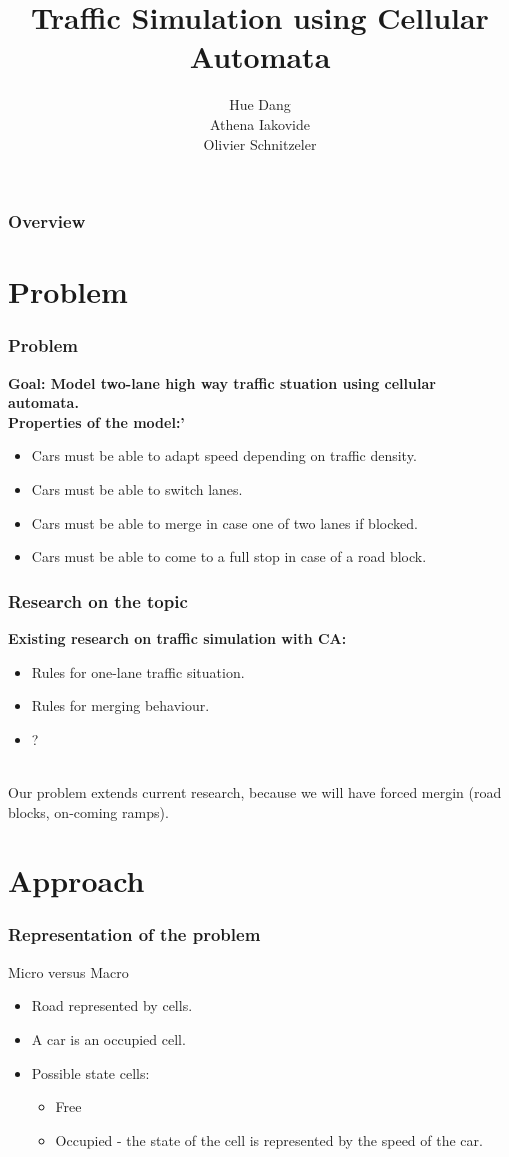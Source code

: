 \documentclass{beamer}
\title{Traffic Simulation using Cellular Automata}
\institute[Radboud University Nijmegen]{Radboud University Nijmegen}
\author{Hue Dang \\ Athena Iakovide \\ Olivier Schnitzeler}
\begin{document}
\begin{frame}
	\titlepage
\end{frame}

\begin{frame}
	\frametitle{Overview}
	\tableofcontents
\end{frame}

\section{Problem}
\begin{frame}
\frametitle{Problem}
\bf{Goal:} Model two-lane high way traffic stuation using cellular automata.\\
\bf{Properties of the model:}'\\
\begin{itemize}
	\item Cars must be able to adapt speed depending on traffic density.
	\item Cars must be able to switch lanes. 
	\item Cars must be able to merge in case one of two lanes if blocked.
	\item Cars must be able to come to a full stop in case of a road block.
\end{itemize}
\end{frame}

\begin{frame}
\frametitle{Research on the topic}
\bf{Existing research on traffic simulation with CA:}
\begin{itemize}
	\item Rules for one-lane traffic situation.
	\item Rules for merging behaviour. 
	\item ?
\end{itemize}
\\
Our problem extends current research, because we will have forced mergin (road blocks, on-coming ramps).
\end{frame}



\section{Approach}
\begin{frame}
\frametitle{Representation of the problem}
\large{Micro versus Macro}
\begin{itemize}
\item Road represented by cells.
\item A car is an occupied cell. 
\item Possible state cells:
\begin{itemize}
	\item Free
	\item Occupied - the state of the cell is represented by the speed of the car. 
\end{itemize}
\end{itemize}
\end{frame}
\end{document}
